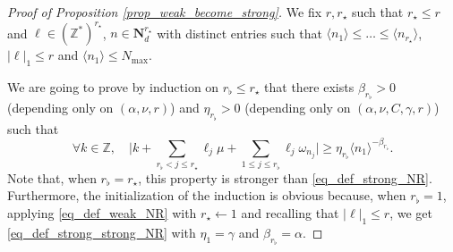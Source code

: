 \documentclass[JEP,XML,SOM,Unicode,NoEqCountersInSection,published]{cedram}
\theoremstyle{definition}
\begin{document}
\begin{proof}[Proof of Proposition \ref{prop_weak_become_strong}] We fix $r,r_\star$ such that $r_\star \leq r$ and $\ell \in (\mathbb{Z}^*)^{r_\star}$, $n \in \mathbf{N}_d^{r_\star}$ with distinct entries such that $\langle n_1 \rangle \leq \dots \leq \langle n_{r_\star} \rangle$, $|\ell|_1 \leq r$ and $\langle n_1 \rangle \leq N_{\max}$.

We are going to prove by induction on $r_{\flat}\leq r_\star$ that there exists $\beta_{r_\flat}>0$ (depending only on $(\alpha,\nu,r)$) and $\eta_{r_\flat} >0$ (depending only on $(\alpha,\nu,C,\gamma,r)$) such that
\begin{equation}
\label{eq_def_strong_strong_NR}
\forall k \in \mathbb{Z}, \quad \biggl| k + \sum_{r_{\flat} <j \leq r_\star} \ell_j \mu + \sum_{1\leq j \leq r_{\flat} }\ell_j \omega_{n_j} \biggr| \geq \eta_{r_\flat} \langle n_{1} \rangle^{-\beta_{r_\flat}}.
\end{equation}
Note that, when $r_{\flat}= r_\star$, this property is stronger than \eqref{eq_def_strong_NR}. Furthermore, the initialization of the induction is obvious because, when $r_{\flat}=1$, applying \eqref{eq_def_weak_NR} with $r_\star \leftarrow 1$ and recalling that $|\ell|_1 \leq r$, we get \eqref{eq_def_strong_strong_NR} with $\eta_{1} = \gamma$ and $\beta_{r_\flat} = \alpha$.


\end{proof}
\end{document}
